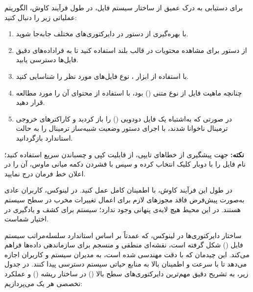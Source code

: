 برای دستیابی به درک عمیق از ساختار سیستم فایل، در طول فرآیند کاوش، الگوریتم عملیاتی زیر را دنبال کنید:

\begin{enumerate}
  \item با بهره‌گیری از دستور  در دایرکتوری‌های مختلف جابه‌جا شوید.
  \item از دستور  برای مشاهده محتویات در قالب بلند استفاده کنید تا به فراداده‌های دقیق فایل‌ها دسترسی یابید.
  \item با استفاده از ابزار ، نوع فایل‌های مورد نظر را شناسایی کنید.
  \item چنانچه ماهیت فایل از نوع متنی () بود، با استفاده از  محتوای آن را مورد مطالعه قرار دهید.
  \item در صورتی که به‌اشتباه یک فایل دودویی () را باز کردید و کاراکترهای خروجی ترمینال ناخوانا شدند، با اجرای دستور  وضعیت شبیه‌ساز ترمینال را به حالت استاندارد بازگردانید.
\end{enumerate}

\begin{note}
\textbf{نکته:} جهت پیشگیری از خطاهای تایپی، از قابلیت کپی و چسباندن سریع استفاده کنید؛ نام فایل را با دوبار کلیک انتخاب کرده و سپس با فشردن دکمه میانی ماوس، آن را در اعلان خط فرمان درج نمایید.
\end{note}

در طول این فرآیند کاوش، با اطمینان کامل عمل کنید. در لینوکس، کاربران عادی به‌صورت پیش‌فرض فاقد مجوزهای لازم برای اعمال تغییرات مخرب در سطح سیستم هستند. در این محیط هیچ لایه‌ی پنهانی وجود ندارد؛ سیستم برای کشف و یادگیری در اختیار شماست.

ساختار دایرکتوری‌ها در لینوکس، که عمدتاً بر اساس استاندارد سلسله‌مراتب سیستم فایل () شکل گرفته است، نقشه‌ای منطقی و منسجم برای سازماندهی داده‌ها فراهم می‌کند. این چیدمان که با دقت مهندسی شده است، به مدیران سیستم و کاربران اجازه می‌دهد تا با سرعت و اطمینان بالا به منابع حیاتی سیستم دسترسی پیدا کنند. در جدول زیر، به تشریح دقیق مهم‌ترین دایرکتوری‌های سطح بالا () در ساختار ریشه (\cmd{/}) و عملکرد تخصصی هر یک می‌پردازیم:

